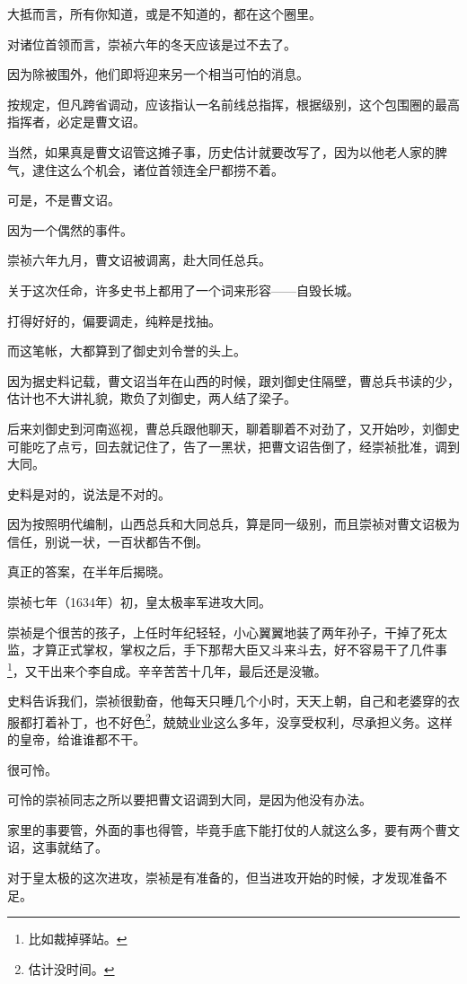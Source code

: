 \begin{multicols}{\theparacolNo}
大抵而言，所有你知道，或是不知道的，都在这个圈里。

对诸位首领而言，崇祯六年的冬天应该是过不去了。

因为除被围外，他们即将迎来另一个相当可怕的消息。

按规定，但凡跨省调动，应该指认一名前线总指挥，根据级别，这个包围圈的最高指挥者，必定是曹文诏。

当然，如果真是曹文诏管这摊子事，历史估计就要改写了，因为以他老人家的脾气，逮住这么个机会，诸位首领连全尸都捞不着。

可是，不是曹文诏。

因为一个偶然的事件。

崇祯六年九月，曹文诏被调离，赴大同任总兵。

关于这次任命，许多史书上都用了一个词来形容——自毁长城。

打得好好的，偏要调走，纯粹是找抽。

而这笔帐，大都算到了御史刘令誉的头上。

因为据史料记载，曹文诏当年在山西的时候，跟刘御史住隔壁，曹总兵书读的少，估计也不大讲礼貌，欺负了刘御史，两人结了梁子。

后来刘御史到河南巡视，曹总兵跟他聊天，聊着聊着不对劲了，又开始吵，刘御史可能吃了点亏，回去就记住了，告了一黑状，把曹文诏告倒了，经崇祯批准，调到大同。

史料是对的，说法是不对的。

因为按照明代编制，山西总兵和大同总兵，算是同一级别，而且崇祯对曹文诏极为信任，别说一状，一百状都告不倒。

真正的答案，在半年后揭晓。

崇祯七年（1634年）初，皇太极率军进攻大同。

崇祯是个很苦的孩子，上任时年纪轻轻，小心翼翼地装了两年孙子，干掉了死太监，才算正式掌权，掌权之后，手下那帮大臣又斗来斗去，好不容易干了几件事\footnote{比如裁掉驿站。}，又干出来个李自成。辛辛苦苦十几年，最后还是没辙。

史料告诉我们，崇祯很勤奋，他每天只睡几个小时，天天上朝，自己和老婆穿的衣服都打着补丁，也不好色\footnote{估计没时间。}，兢兢业业这么多年，没享受权利，尽承担义务。这样的皇帝，给谁谁都不干。

很可怜。

可怜的崇祯同志之所以要把曹文诏调到大同，是因为他没有办法。

家里的事要管，外面的事也得管，毕竟手底下能打仗的人就这么多，要有两个曹文诏，这事就结了。

对于皇太极的这次进攻，崇祯是有准备的，但当进攻开始的时候，才发现准备不足。


\end{multicols}
